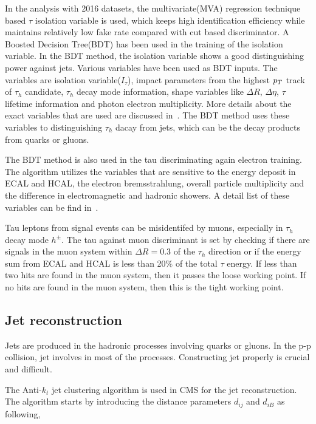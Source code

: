 In the analysis with 2016 datasets, the multivariate(MVA) regression technique based $\tau$ isolation variable is used, which keeps high identification efficiency while maintains relatively low fake rate compared with cut based discriminator. A Boosted Decision Tree(BDT) has been used in the training of the isolation variable. In the BDT method, the isolation variable shows a good distinguishing power against jets. Various variables have been used as BDT inputs. The variables are isolation variable($I_{\tau}$), impact parameters from the highest $p_{T}$ track of $\tau_{h}$ candidate, $\tau_{h}$ decay mode information, shape variables like $\Delta R$, $\Delta \eta$, $\tau$ lifetime information and photon electron multiplicity. More details about the exact variables that are used are discussed in~\cite{TauRecoandIDRunII,TauReconstuction}. The BDT method uses these variables to distinguishing $\tau_{h}$ dacay from jets, which can be the decay products from quarks or gluons.  

The BDT method is also used in the tau discriminating again electron training. The algorithm utilizes the variables that are sensitive to the energy deposit in ECAL and HCAL, the electron bremsstrahlung, overall particle multiplicity and the difference in electromagnetic and hadronic showers. A detail list of these variables can be find in~\cite{TauRecoandIDRunII,TauReconstuction}.

Tau leptons from signal events can be misidentifed by muons, especially in $\tau_{h}$ decay mode $h^{\pm}$. The tau against muon discriminant is set by checking if there are signals in the muon system within $\Delta R=0.3$ of the $\tau_{h}$ direction or if the energy sum from ECAL and HCAL is less than 20$\%$ of the total $\tau$ energy. If less than two hits are found in the muon system, then it passes the loose working point. If no hits are found in the muon system, then this is the tight working point. 

\subsection{Jet reconstruction}
Jets are produced in the hadronic processes involving quarks or gluons. In the p-p collision, jet involves in most of the processes. Constructing jet properly is crucial and difficult. 

The Anti-$k_{t}$ jet clustering algorithm is used in CMS for the jet reconstruction. The algorithm starts by introducing the distance parameters $d_{ij}$ and $d_{iB}$ as following,

